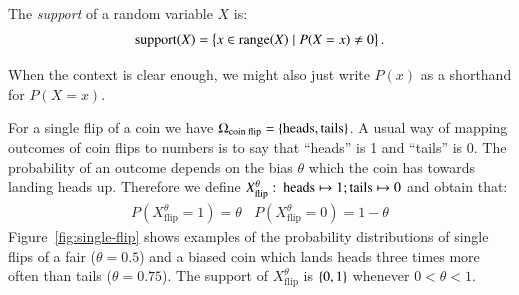 \documentclass[nobib,nofonts]{tufte-handout}
\begin{document}
The \emph{support} of a random variable $X$ is:
\begin{align*}
  \text{support}(X) = \left\{x \in \text{range}(X) \mid P(X = x) \neq 0\right\}.
\end{align*}

When the context is clear enough, we might also just write $P(x)$ as a shorthand for $P(X = x)$.

\begin{example}
  \label{example:single-coin-RV}

  For a single flip of a coin we have $\Omega_{\text{coin flip}} = \left\{\text{heads}, \text{tails}\right\}$.
  A usual way of mapping outcomes of coin flips to numbers is to say that ``heads'' is 1 and ``tails'' is 0.
  The probability of an outcome depends on the bias $\theta$ which the coin has towards landing heads up.
  Therefore we define $X_{\text{flip}}^{\theta} \thinspace \colon \thinspace \text{heads} \mapsto 1; \text{tails} \mapsto 0$ and obtain that:
  \begin{align*}
    P(X_{\text{flip}}^{\theta} = 1) = \theta \ \ \ \ P(X_{\text{flip}}^{\theta} = 0) = 1-\theta
  \end{align*}
  Figure~\ref{fig:single-flip} shows examples of the probability distributions of single flips of a fair ($\theta = 0.5$) and a biased coin which lands heads three times more often than tails ($\theta=0.75$).
  The support of $X_{\text{flip}}^{\theta}$ is $\left\{0,1\right\}$ whenever $0 < \theta < 1$.

  \begin{figure}
    \centering
    \singleCoinFlips


\end{figure}
\end{example}
\end{document}
